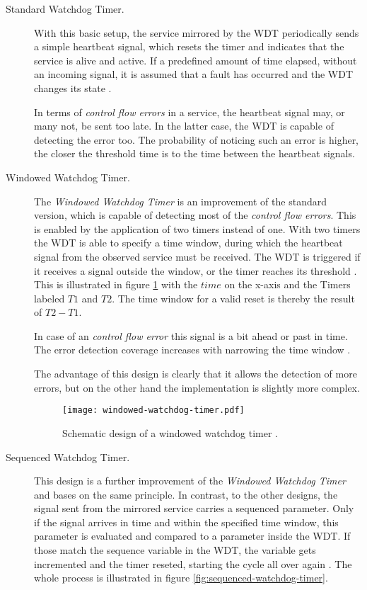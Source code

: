 \begin{description}
\item [Standard Watchdog Timer.]
With this basic setup, the service mirrored by the WDT periodically sends a simple heartbeat signal, which resets the timer and indicates that the service is alive and active. If a predefined amount of time elapsed, without an incoming signal, it is assumed that a fault has occurred and the WDT changes its state \cite{elattar2007}.

In terms of \emph{control flow errors} in a service, the heartbeat signal may, or many not, be sent too late. In the latter case, the WDT is capable of detecting the error \cite{elattar2007} too. The probability of noticing such an error is higher, the closer the threshold time is to the time between the heartbeat signals.

\item [Windowed Watchdog Timer.]
The \emph{Windowed Watchdog Timer} is an improvement of the standard version, which is capable of detecting most of the \emph{control flow errors}. This is enabled by the application of two timers instead of one. With two timers the WDT is able to specify a time window, during which the heartbeat signal from the observed service must be received. The WDT is triggered if it receives a signal outside the window, or the timer reaches its threshold \cite{elattar2007}. This is illustrated in figure \ref{fig:windowed-watchdog-timer} with the $time$ on the x-axis and the Timers labeled $T1$ and $T2$. The time window for a valid reset is thereby the result of $T2 - T1$.

In case of an \emph{control flow error} this signal is a bit ahead or past in time. The error detection coverage increases with narrowing the time window \cite{elattar2007}.  

The advantage of this design is clearly that it allows the detection of more errors, but on the other hand the implementation is slightly more complex.

\begin{figure}[!htbp]
\centering
\texttt{[image: windowed-watchdog-timer.pdf]}
\caption{Schematic design of a windowed watchdog timer \cite{elattar2007}.}
\label{fig:windowed-watchdog-timer}
\end{figure}

\item [Sequenced Watchdog Timer.] 
This design is a further improvement of the \emph{Windowed Watchdog Timer} and bases on the same principle. In contrast, to the other designs, the signal sent from the mirrored service carries a sequenced parameter. Only if the signal arrives in time and within the specified time window, this parameter is evaluated and compared to a parameter inside the WDT. If those match the sequence variable in the WDT, the variable gets incremented and the timer reseted, starting the cycle all over again \cite{elattar2007}.
The whole process is illustrated in figure \ref{fig:sequenced-watchdog-timer}.


\end{description}
